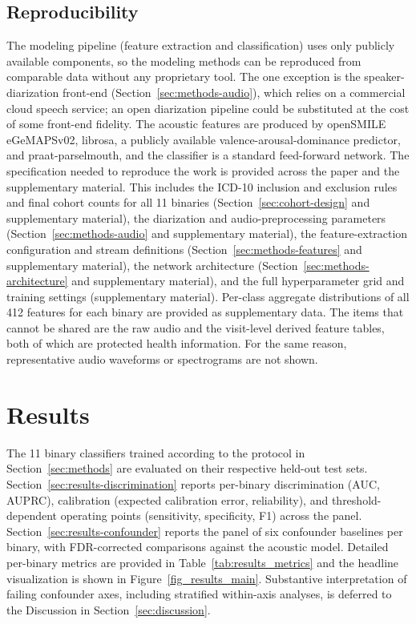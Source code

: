 \documentclass[utf8]{FrontiersinHarvard} %
\begin{document}
\subsection{Reproducibility}
\label{sec:methods-reproducibility}

The modeling pipeline (feature extraction and classification) uses only publicly available components, so the modeling methods can be reproduced from comparable data without any proprietary tool. The one exception is the speaker-diarization front-end (Section~\ref{sec:methods-audio}), which relies on a commercial cloud speech service; an open diarization pipeline could be substituted at the cost of some front-end fidelity. The acoustic features are produced by openSMILE eGeMAPSv02, librosa, a publicly available valence-arousal-dominance predictor, and praat-parselmouth, and the classifier is a standard feed-forward network. The specification needed to reproduce the work is provided across the paper and the supplementary material. This includes the ICD-10 inclusion and exclusion rules and final cohort counts for all 11 binaries (Section~\ref{sec:cohort-design} and supplementary material), the diarization and audio-preprocessing parameters (Section~\ref{sec:methods-audio} and supplementary material), the feature-extraction configuration and stream definitions (Section~\ref{sec:methods-features} and supplementary material), the network architecture (Section~\ref{sec:methods-architecture} and supplementary material), and the full hyperparameter grid and training settings (supplementary material). Per-class aggregate distributions of all 412 features for each binary are provided as supplementary data. The items that cannot be shared are the raw audio and the visit-level derived feature tables, both of which are protected health information. For the same reason, representative audio waveforms or spectrograms are not shown.


\section{Results}
\label{sec:results}

The 11 binary classifiers trained according to the protocol in Section~\ref{sec:methods} are evaluated on their respective held-out test sets. Section~\ref{sec:results-discrimination} reports per-binary discrimination (AUC, AUPRC), calibration (expected calibration error, reliability), and threshold-dependent operating points (sensitivity, specificity, F1) across the panel. Section~\ref{sec:results-confounder} reports the panel of six confounder baselines per binary, with FDR-corrected comparisons against the acoustic model. Detailed per-binary metrics are provided in Table~\ref{tab:results_metrics} and the headline visualization is shown in Figure~\ref{fig_results_main}. Substantive interpretation of failing confounder axes, including stratified within-axis analyses, is deferred to the Discussion in Section~\ref{sec:discussion}.
\end{document}
